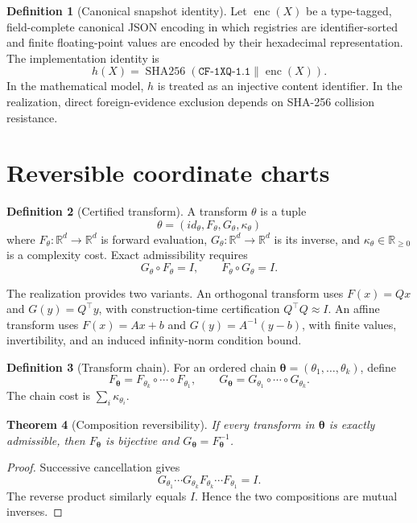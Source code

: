 \documentclass[11pt]{article}
\theoremstyle{definition}
\newtheorem{definition}{Definition}[section]
\theoremstyle{plain}
\newtheorem{theorem}[definition]{Theorem}
\newcommand{\R}{\mathbb{R}}
\newcommand{\modelid}{\texttt{CF-1XQ-1.1}}
\begin{document}
\begin{definition}[Canonical snapshot identity]
Let $\operatorname{enc}(X)$ be a type-tagged, field-complete canonical JSON
encoding in which registries are identifier-sorted and finite floating-point
values are encoded by their hexadecimal representation.  The implementation
identity is
\[
  h(X)=\operatorname{SHA256}(\modelid\parallel\operatorname{enc}(X)).
\]
In the mathematical model, $h$ is treated as an injective content identifier.
In the realization, direct foreign-evidence exclusion depends on SHA-256
collision resistance.
\end{definition}

\section{Reversible coordinate charts}

\begin{definition}[Certified transform]
A transform $\theta$ is a tuple
\[
  \theta=(id_\theta,F_\theta,G_\theta,\kappa_\theta)
\]
where $F_\theta:\R^d\to\R^d$ is forward evaluation,
$G_\theta:\R^d\to\R^d$ is its inverse, and
$\kappa_\theta\in\R_{\ge0}$ is a complexity cost.  Exact admissibility requires
\[
  G_\theta\circ F_\theta=I,\qquad F_\theta\circ G_\theta=I.
\]
\end{definition}

The realization provides two variants.  An orthogonal transform uses
$F(x)=Qx$ and $G(y)=Q^\top y$, with construction-time certification
$Q^\top Q\approx I$.  An affine transform uses $F(x)=Ax+b$ and
$G(y)=A^{-1}(y-b)$, with finite values, invertibility, and an induced
infinity-norm condition bound.

\begin{definition}[Transform chain]
For an ordered chain $\boldsymbol\theta=(\theta_1,\ldots,\theta_k)$, define
\[
  F_{\boldsymbol\theta}
  =F_{\theta_k}\circ\cdots\circ F_{\theta_1},
  \qquad
  G_{\boldsymbol\theta}
  =G_{\theta_1}\circ\cdots\circ G_{\theta_k}.
\]
The chain cost is $\sum_i\kappa_{\theta_i}$.
\end{definition}

\begin{theorem}[Composition reversibility]
\label{thm:reversibility}
If every transform in $\boldsymbol\theta$ is exactly admissible, then
$F_{\boldsymbol\theta}$ is bijective and
$G_{\boldsymbol\theta}=F_{\boldsymbol\theta}^{-1}$.
\end{theorem}

\begin{proof}
Successive cancellation gives
\[
 G_{\theta_1}\cdots G_{\theta_k}
 F_{\theta_k}\cdots F_{\theta_1}=I.
\]
The reverse product similarly equals $I$.  Hence the two compositions are
mutual inverses.
\end{proof}
\end{document}
